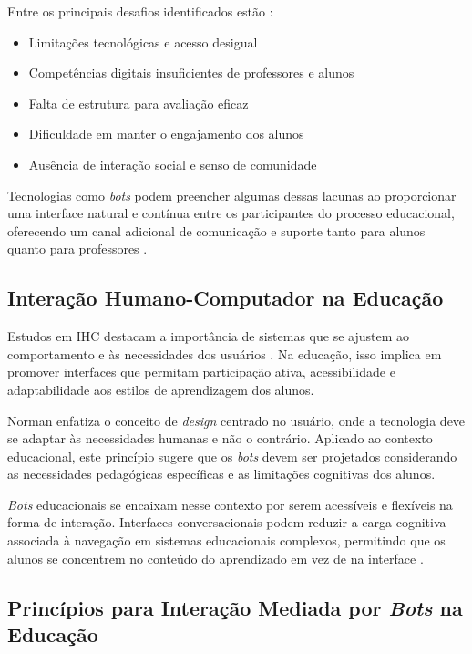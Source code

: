 \noindent Entre os principais desafios identificados estão \cite{fabiane2024}:

\begin{itemize}
\item Limitações tecnológicas e acesso desigual
\item Competências digitais insuficientes de professores e alunos
\item Falta de estrutura para avaliação eficaz
\item Dificuldade em manter o engajamento dos alunos
\item Ausência de interação social e senso de comunidade
\end{itemize}

\noindent Tecnologias como \textit{bots} podem preencher algumas dessas lacunas
ao proporcionar uma interface natural e contínua entre os participantes do
processo educacional, oferecendo um canal adicional de comunicação e suporte
tanto para alunos quanto para professores \cite{winkler2018}.

\subsection{Interação Humano-Computador na Educação} \label{subsec:ihc}

Estudos em IHC destacam a importância de sistemas que se ajustem ao
comportamento e às necessidades dos usuários \cite{roy1987}. Na educação, isso
implica em promover interfaces que permitam participação ativa, acessibilidade e
adaptabilidade aos estilos de aprendizagem dos alunos.

Norman \cite{norman2013} enfatiza o conceito de \textit{design} centrado no
usuário, onde a tecnologia deve se adaptar às necessidades humanas e não o
contrário. Aplicado ao contexto educacional, este princípio sugere que os
\textit{bots} devem ser projetados considerando as necessidades pedagógicas
específicas e as limitações cognitivas dos alunos.

\textit{Bots} educacionais se encaixam nesse contexto por serem acessíveis e
flexíveis na forma de interação. Interfaces conversacionais podem reduzir a
carga cognitiva associada à navegação em sistemas educacionais complexos,
permitindo que os alunos se concentrem no conteúdo do aprendizado em vez de na
interface \cite{sweller2011}.

\subsection{Princípios para Interação Mediada por \textit{Bots} na Educação}
\label{subsec:principios}

